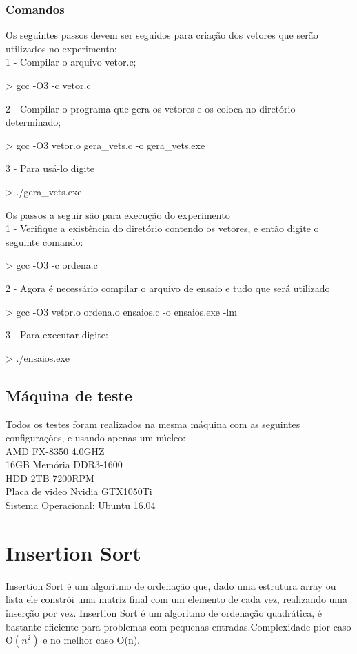 \documentclass[12pt,a4paper,twoside]{report}
\begin{document}
\subsection{Comandos}
Os seguintes passos devem ser seguidos para criação dos vetores que serão utilizados no experimento:\\
1 - Compilar o arquivo vetor.c;
\begin{terminal}
    > gcc -O3 -c vetor.c
\end{terminal}
2 - Compilar o programa que gera os vetores e os coloca no diretório determinado;
\begin{terminal}
    > gcc -O3 vetor.o gera_vets.c -o gera_vets.exe
\end{terminal}
3 - Para usá-lo digite
\begin{terminal}
    > ./gera_vets.exe
\end{terminal}

Os passos a seguir são para execução do experimento\\
1 - Verifique a existência do diretório contendo os vetores, e então digite o seguinte comando:
\begin{terminal}
    > gcc -O3 -c ordena.c
\end{terminal}
2 - Agora é necessário compilar o arquivo de ensaio e tudo que será utilizado
\begin{terminal}
    > gcc -O3 vetor.o ordena.o ensaios.c -o ensaios.exe -lm
\end{terminal}
3 - Para executar digite:
\begin{terminal}
    > ./ensaios.exe
\end{terminal}

\section{Máquina de teste}
Todos os testes foram realizados na mesma máquina com as seguintes configurações, e usando apenas um núcleo:\\
AMD FX-8350 4.0GHZ\\
16GB Memória DDR3-1600\\
HDD 2TB 7200RPM\\
Placa de video Nvidia GTX1050Ti\\
Sistema Operacional: Ubuntu 16.04\\

\chapter{Insertion Sort}
Insertion Sort é um algoritmo de ordenação que, dado uma estrutura array ou lista ele constrói uma matriz final com um elemento de cada vez, realizando uma inserção por vez. Insertion Sort é um algoritmo de ordenação quadrática, é bastante eficiente para problemas com pequenas entradas.Complexidade pior caso O$(n^2)$ e no melhor caso O(n).
\end{document}
